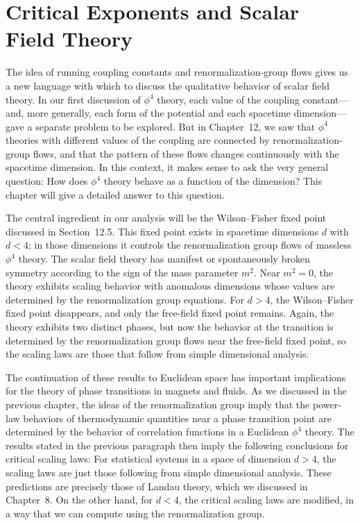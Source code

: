 \chapter{Critical Exponents and Scalar Field Theory}

The idea of running coupling constants and renormalization-group flows gives
us a new language with which to discuss the qualitative behavior of scalar
field theory.  In our first discussion of $\phi^4$ theory, each value of the
coupling constant---and, more generally, each form of the potential and each
spacetime dimension---gave a separate problem to be explored.  But in
Chapter~12, we saw that $\phi^4$ theories with different values of the
coupling are connected by renormalization-group flows, and that the pattern of
these flows changes continuously with the spacetime dimension.  In this
context, it makes sense to ask the very general question: How does $\phi^4$
theory behave as a function of the dimension?  This chapter will give a
detailed answer to this question.

The central ingredient in our analysis will be the Wilson--Fisher fixed point
discussed in Section~12.5.  This fixed point exists in spacetime dimensions
$d$ with $d < 4$; in those dimensions it controls the renormalization group
flows of massless $\phi^4$ theory.  The scalar field theory has manifest or
spontaneously broken symmetry according to the sign of the mass parameter
$m^2$.  Near $m^2 = 0$, the theory exhibits scaling behavior with anomalous
dimensions whose values are determined by the renormalization group
equations.  For $d > 4$, the Wilson--Fisher fixed point disappears, and only
the free-field fixed point remains.  Again, the theory exhibits two distinct
phases, but now the behavior at the transition is determined by the
renormalization group flows near the free-field fixed point, so the scaling
laws are those that follow from simple dimensional analysis.

The continuation of these results to Euclidean space has important
implications for the theory of phase transitions in magnets and fluids.  As we
discussed in the previous chapter, the ideas of the renormalization group
imply that the power-law behaviors of thermodynamic quantities near a phase
transition point are determined by the behavior of correlation functions in a
Euclidean $\phi^4$ theory.  The results stated in the previous paragraph then
imply the following conclusions for critical scaling laws: For statistical
systems in a space of dimension $d > 4$, the scaling laws are just those
following from simple dimensional analysis.  These predictions are precisely
those of Landau theory, which we discussed in Chapter~8.  On the other hand,
for $d < 4$, the critical scaling laws are modified, in a way that we can
compute using the renormalization group.


